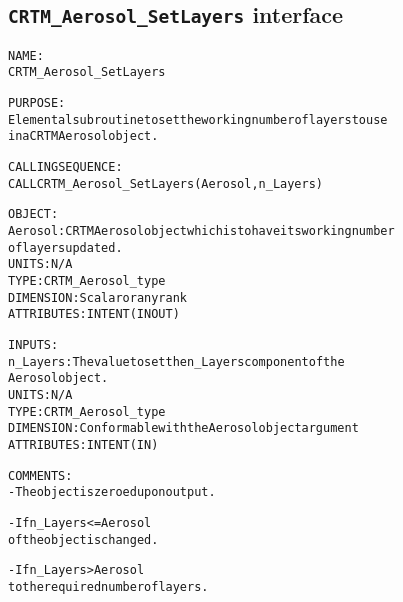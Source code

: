 \subsection{\texttt{CRTM\_Aerosol\_SetLayers} interface}
  \label{sec:CRTM_Aerosol_SetLayers_interface}
  \begin{alltt}
 
  NAME:
        CRTM_Aerosol_SetLayers
 
  PURPOSE:
        Elemental subroutine to set the working number of layers to use
        in a CRTM Aerosol object.
 
  CALLING SEQUENCE:
       CALL CRTM_Aerosol_SetLayers( Aerosol, n_Layers )
 
  OBJECT:
        Aerosol:      CRTM Aerosol object which is to have its working number
                      of layers updated.
                      UNITS:      N/A
                      TYPE:       CRTM_Aerosol_type
                      DIMENSION:  Scalar or any rank
                      ATTRIBUTES: INTENT(IN OUT)
 
  INPUTS:
        n_Layers:     The value to set the n_Layers component of the
                      Aerosol object.
                      UNITS:      N/A
                      TYPE:       CRTM_Aerosol_type
                      DIMENSION:  Conformable with the Aerosol object argument
                      ATTRIBUTES: INTENT(IN)
 
  COMMENTS:
        - The object is zeroed upon output.
 
        - If n_Layers <= Aerosol%Max_Layers, then only the dimension value
          of the object is changed.
 
        - If n_Layers > Aerosol%Max_Layers, then the object is reallocated
          to the required number of layers.
 
  \end{alltt}
